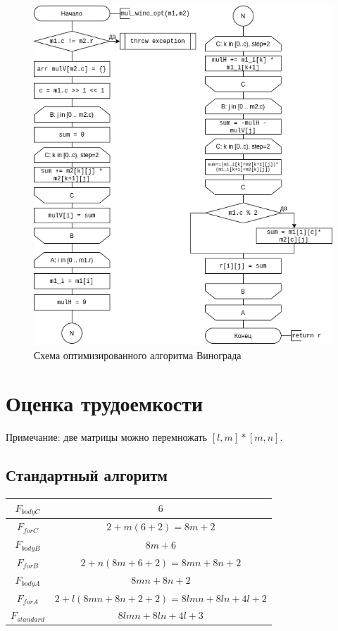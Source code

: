 \begin{figure}[h!]
    \centering
    \includegraphics[width=1\textwidth]{2/inc/d3.png}
    \caption{Схема оптимизированного алгоритма Винограда}
    \label{fig:2.3}
\end{figure}

\clearpage
\section{Оценка трудоемкости}

Примечание: две матрицы можно перемножать $[l,m] * [m,n]$.


\subsection{Стандартный алгоритм}


\begin{tabular}{|c|c|}
    \hline
    $F_{bodyC}$ & $6$ \\\hline
    $F_{forC}$  & $2 + m (6 + 2) = 8m + 2$ \\\hline
    $F_{bodyB}$ & $8m + 6$ \\\hline
    $F_{forB}$  & $2 + n (8m + 6 + 2) = 8mn + 8n + 2$ \\\hline
    $F_{bodyA}$ & $8mn + 8n + 2$ \\\hline
    $F_{forA}$  & $2 + l (8mn + 8n + 2 + 2) = 8lmn + 8ln + 4l + 2$ \\\hline
    $F_{standard}$ & $8lmn + 8ln + 4l + 3$ \\\hline
\end{tabular}


